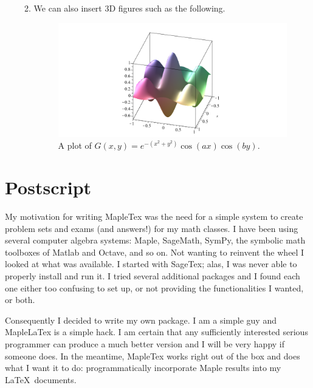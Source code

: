 \documentclass{article}
\begin{document}
\begin{enumerate}
\begin{enumerate}
\[ \]
 \item We can also insert 3D figures such as the following.
 \begin{figure}[H]
 \centering
 \includegraphics[scale=0.4]{FIG002}
 \caption{A plot of \(G(x,y)=e^{-(x^2+y^2)}\cos(ax)\cos(by)\).}  \label{FIG002}
 \end{figure}
 
 \end{enumerate}
 \end{enumerate}
 
 \section{Postscript}
 My motivation for writing \textsf{MapleTex} was the need for a simple system to create problem sets and exams 
 (and answers!) for my math classes. I have been using several computer algebra systems: 
 \textsf{Maple}, \textsf{SageMath}, \textsf{SymPy},
 the symbolic math toolboxes of \textsf{Matlab} and \textsf{Octave},  and so on.
 Not wanting to reinvent the wheel I looked at what was available. I started with \textsf{SageTex}; alas, I was
 never able to properly install and run it. I tried several additional packages and I found each one either 
 too confusing to set up, or not providing the functionalities I wanted, or both.
 
 Consequently I decided to write my own package. I am a simple guy and \textsf{MapleLaTex} is a simple hack. 
 I am certain that any sufficiently interested serious programmer can produce a much better version
 and I will be very happy if someone does. 
 In the meantime, \textsf{MapleTex} works  right out of the box and does what I want it to do: 
 programmatically incorporate \textsf{Maple} results into my \LaTeX\  documents. 
 
\end{document}
